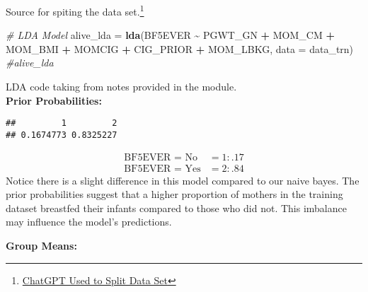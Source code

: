 \documentclass[
]{article}
\newenvironment{Shaded}{\begin{snugshade}}{\end{snugshade}}
\newcommand{\AttributeTok}[1]{\textcolor[rgb]{0.13,0.29,0.53}{#1}}
\newcommand{\CommentTok}[1]{\textcolor[rgb]{0.56,0.35,0.01}{\textit{#1}}}
\newcommand{\FunctionTok}[1]{\textcolor[rgb]{0.13,0.29,0.53}{\textbf{#1}}}
\newcommand{\NormalTok}[1]{#1}
\newcommand{\OtherTok}[1]{\textcolor[rgb]{0.56,0.35,0.01}{#1}}
\newcommand{\SpecialCharTok}[1]{\textcolor[rgb]{0.81,0.36,0.00}{\textbf{#1}}}
\newcommand{\StringTok}[1]{\textcolor[rgb]{0.31,0.60,0.02}{#1}}
\begin{document}
Source for spiting the data set.\footnote{\href{https://chatgpt.com/share/6713d973-d3c0-8011-987f-9d3751de0981}{ChatGPT
  Used to Split Data Set}}\\

\begin{Shaded}
\begin{Highlighting}[]
\CommentTok{\# LDA Model}
\NormalTok{alive\_lda }\OtherTok{=} \FunctionTok{lda}\NormalTok{(BF5EVER }\SpecialCharTok{\textasciitilde{}}\NormalTok{ PGWT\_GN }\SpecialCharTok{+}\NormalTok{ MOM\_CM }\SpecialCharTok{+}\NormalTok{ MOM\_BMI }\SpecialCharTok{+}\NormalTok{ MOMCIG }\SpecialCharTok{+}\NormalTok{ CIG\_PRIOR }\SpecialCharTok{+}\NormalTok{ MOM\_LBKG, }\AttributeTok{data =}\NormalTok{ data\_trn)}
\CommentTok{\#alive\_lda}
\end{Highlighting}
\end{Shaded}

LDA code taking from notes provided in the module.\\

\textbf{Prior Probabilities:}\\

\begin{Shaded}
\end{Shaded}

\begin{verbatim}
##         1         2 
## 0.1674773 0.8325227
\end{verbatim}

\[
\begin{aligned}
   \text{BF5EVER = No}  &= 1: .17 \\
   \text{BF5EVER = Yes} &= 2: .84
\end{aligned}
\] Notice there is a slight difference in this model compared to our
naive bayes. The prior probabilities suggest that a higher proportion of
mothers in the training dataset breastfed their infants compared to
those who did not. This imbalance may influence the model's predictions.

\textbf{Group Means:}\\

\begin{Shaded}
\end{Shaded}
\end{document}
